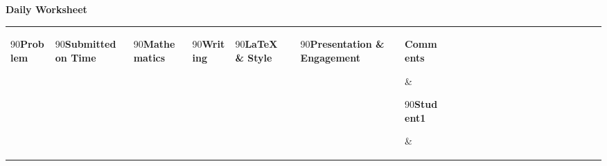\documentclass[landscape]{article}
\begin{document}
\thispagestyle{empty}

\begin{center}
    \Large\textbf{Daily Worksheet}
\end{center}

\vspace{0.5cm}

\setlength{\tabcolsep}{4pt}
\renewcommand{\arraystretch}{1.5}

\noindent
\begin{tabular}{|
>{\centering\arraybackslash}m{1.5 cm}|
>{\centering\arraybackslash}m{0.35cm}|
>{\centering\arraybackslash}m{0.35cm}|
>{\centering\arraybackslash}m{0.35cm}|
>{\centering\arraybackslash}m{0.35cm}|
>{\centering\arraybackslash}m{0.35cm}|
>{\arraybackslash}m{9.5cm}|
>{\centering\arraybackslash}m{0.35cm}|%
>{\centering\arraybackslash}m{0.35cm}|%
>{\centering\arraybackslash}m{0.35cm}|%
>{\centering\arraybackslash}m{0.35cm}|%
>{\centering\arraybackslash}m{0.35cm}|%
>{\centering\arraybackslash}m{0.35cm}|%
>{\centering\arraybackslash}m{0.35cm}|%
>{\centering\arraybackslash}m{0.35cm}|%
>{\centering\arraybackslash}m{0.35cm}|%
>{\centering\arraybackslash}m{0.35cm}|%
>{\centering\arraybackslash}m{0.35cm}|%
>{\centering\arraybackslash}m{0.35cm}|%
>{\centering\arraybackslash}m{0.35cm}|%
>{\centering\arraybackslash}m{0.35cm}|%
>{\centering\arraybackslash}m{0.35cm}|%
>{\centering\arraybackslash}m{0.35cm}|%
}
\hline
\multicolumn{7}{|c|}{\textbf{Presenters}} & \multicolumn{16}{c|}{\textbf{Contributors}} \\
\hline
\begin{turn}{90}\textbf{Problem}\end{turn} &
\begin{turn}{90}\textbf{Submitted on Time}\end{turn} &
\begin{turn}{90}\textbf{Mathematics}\end{turn} &
\begin{turn}{90}\textbf{Writing}\end{turn} &
\begin{turn}{90}\textbf{\LaTeX\ \& Style}\end{turn} &
\begin{turn}{90}\textbf{Presentation \& Engagement}\end{turn} &
\parbox[c][1.5cm][c]{8cm}{\centering\textbf{Comments}} &
\begin{turn}{90}\textbf{Student1}\end{turn} &

\end{tabular}
\end{document}
